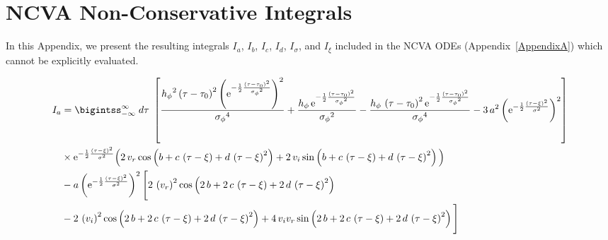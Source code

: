 \chapter{NCVA Non-Conservative Integrals} %
\label{AppendixB} %

In this Appendix, we present the resulting integrals $I_a$, $I_b$, $I_c$, $I_d$, $I_{\sigma}$, and $I_{\xi}$ included in the NCVA ODEs (Appendix~\ref{AppendixA}) which cannot be explicitly evaluated.

\begin{landscape}
\small
\begin{align}
I_a & =  \bigintss_{-\infty}^{\infty} \; d\tau\; \left[ \frac{{{ h_{\phi}}}^{2} \left( \tau-{ \tau_0} \right) ^{2} \left( {
{\rm e}^{-\frac{1}{2}{\frac { \left( \tau-{ \tau_0} \right) ^{2}}{{{ 
\sigma_{\phi}}}^{2}}}}} \right) ^{2}}{{{ \sigma_{\phi}}}^{4}}+ \frac{{ h_{\phi}}
\,{{\rm e}^{-\frac{1}{2}{\frac { \left( \tau-{ \tau_0} \right) ^{2}}{{{ 
\sigma_{\phi}}}^{2}}}}}}{{{ \sigma_{\phi}}}^{2}} -\frac{{ h_{\phi}}\, \left( \tau-{
 \tau_0} \right) ^{2}{{\rm e}^{-\frac{1}{2}{\frac { \left( \tau-{ \tau_0}
 \right) ^{2}}{{{ \sigma_{\phi}}}^{2}}}}}}{{{ \sigma_{\phi}}}^{4}}-3\,{a
}^{2} \left( {{\rm e}^{-\frac{1}{2}{\frac { \left( \tau-\xi \right) ^{2}}{
{\sigma}^{2}}}}} \right) ^{2} \right] \nonumber \\
& \times {{\rm e}^{-\frac{1}{2}{\frac { \left( 
\tau-\xi \right) ^{2}}{{\sigma}^{2}}}}}  \Big( 2\, v_r \cos \left( b+c\, \left( \tau-\xi \right) +d\,
 \left( \tau-\xi \right) ^{2} \right) +2\,v_i \sin \left( b+c\, \left( \tau-\xi \right) +d\, \left( \tau-{
 \xi} \right) ^{2} \right)  \Big)  \nonumber \\
 &- a \left( {{\rm e}^{-\frac{1}{2}{
\frac { \left( \tau-\xi \right) ^{2}}{{\sigma}^{2}}}}} \right) ^{2}
 \Bigg[ 2\, \left( v_r \right) ^{2}
\cos \left( 2\,b+2\,c\, \left( \tau-\xi \right) +2\,d\, \left( \tau-{
 \xi} \right) ^{2} \right) \nonumber \\
 &-2\, \left( v_i  \right) ^{2}\cos \left( 2\,b+2\,c\, \left( \tau-\xi
 \right) +2\,d\, \left( \tau-\xi \right) ^{2} \right) +4\,v_i v_r \sin
 \left( 2\,b+2\,c\, \left( \tau-\xi \right) +2\,d\, \left( \tau-{ \xi
} \right) ^{2} \right)  \Bigg] 
\end{align}


\end{landscape}
